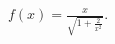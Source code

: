 \label{problemDifferentialtexDivsqrt(1+2divx^2)}  $\displaystyle  f(x)=\frac{x }{\sqrt{1+\frac{2}{x^2}}}$.

